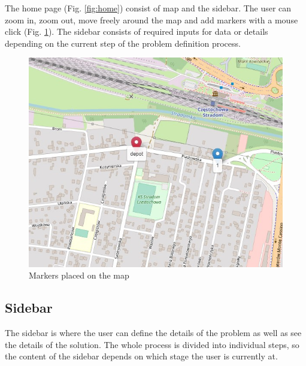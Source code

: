 \documentclass[a4paper,twoside,12pt]{book}
\begin{document}
The home page (Fig. \ref{fig:home}) consist of map and the sidebar. The user can zoom in, zoom out, move freely around the map and add markers with a mouse click (Fig. \ref{fig:markers}). The sidebar consists of required inputs for data or details depending on the current step of the problem definition process.

\begin{figure}[H]
\centering
\includegraphics[scale=0.5]{images/markers.jpg}
\caption{Markers placed on the map}
\label{fig:markers}
\end{figure}

\subsection{Sidebar}
The sidebar is where the user can define the details of the problem as well as see the details of the solution. The whole process is divided into individual steps, so the content of the sidebar depends on which stage the user is currently at.
\end{document}

